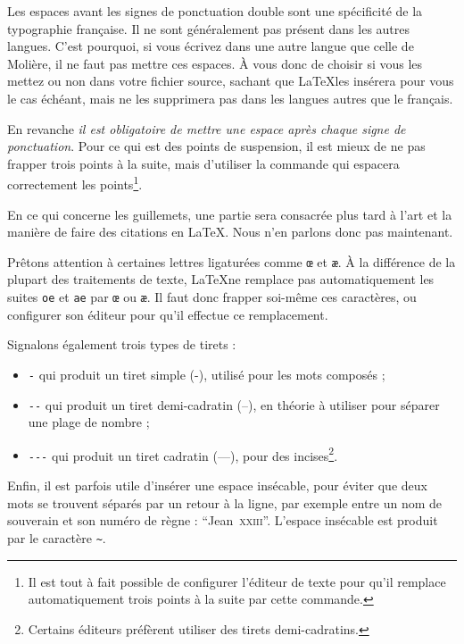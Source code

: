 \begin{attention}
Les espaces avant les signes de ponctuation double sont une spécificité de la typographie française. Il ne sont généralement pas présent dans les autres langues. C'est pourquoi, si vous écrivez dans une autre langue que celle de Molière, il ne faut pas mettre ces espaces. À vous donc de choisir si vous les mettez ou non dans votre fichier source, sachant que \LaTeX les insérera pour vous le cas échéant, mais ne les supprimera pas dans les langues autres que le français.
\end{attention}

En revanche \emph{il est obligatoire de mettre une espace après chaque signe de ponctuation}. Pour ce qui est des points de suspension, il est mieux de ne pas frapper trois points à la suite, mais d'utiliser la commande  qui espacera correctement les points\footnote{Il est tout à fait possible de configurer l'éditeur de texte pour qu'il remplace automatiquement trois points à la suite par cette commande.}.

En ce qui concerne les guillemets, une partie sera consacrée plus tard à l'art et la manière de faire des citations en \LaTeX. Nous n'en parlons donc pas maintenant.

Prêtons attention à certaines lettres ligaturées comme  \verb|œ| et  \verb|æ|. À la différence de la plupart des traitements de texte, \LaTeX ne remplace pas automatiquement les suites \verb|oe| et \verb|ae| par \verb|œ| ou \verb|æ|. Il faut donc frapper soi-même ces caractères, ou configurer son éditeur pour qu'il effectue ce remplacement.

Signalons également trois types de tirets\label{tirets} :
\begin{itemize}
\item \verb|-| qui produit un tiret simple (-), utilisé pour les mots composés ;
\item \verb|--| qui produit un tiret demi-cadratin (--), en théorie à utiliser pour séparer une plage de nombre ;
\item \verb|---| qui produit un tiret cadratin (---), pour des incises\footnote{Certains éditeurs préfèrent utiliser des tirets demi-cadratins.}.
\end{itemize}
 
Enfin, il est parfois utile d'insérer une espace insécable, pour éviter que deux mots se trouvent séparés par un retour à la ligne, par exemple entre un nom de souverain et son numéro de règne : \enquote{Jean~\textsc{xxiii}}.  L'espace insécable est produit par le caractère \verb|~|.



